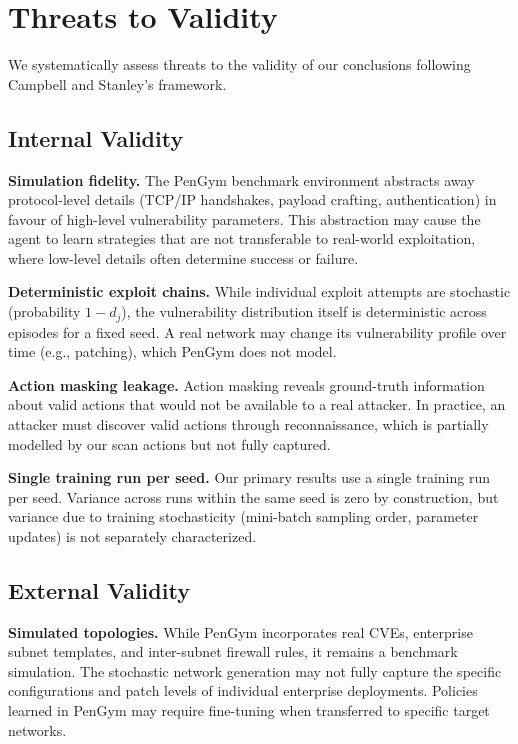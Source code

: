 \documentclass[conference]{IEEEtran}
\begin{document}
\section{Threats to Validity}
\label{sec:threats}

We systematically assess threats to the validity of our conclusions
following Campbell and Stanley's framework.

\subsection{Internal Validity}

\textbf{Simulation fidelity.}  The PenGym benchmark environment abstracts away
protocol-level details (TCP/IP handshakes, payload crafting,
authentication) in favour of high-level vulnerability parameters.
This abstraction may cause the agent to learn strategies that are
not transferable to real-world exploitation, where low-level details
often determine success or failure.

\textbf{Deterministic exploit chains.}  While individual exploit
attempts are stochastic (probability $1 - d_j$), the vulnerability
distribution itself is deterministic across episodes for a fixed seed.
A real network may change its vulnerability profile over time (e.g.,
patching), which PenGym does not model.

\textbf{Action masking leakage.}  Action masking reveals ground-truth
information about valid actions that would not be available to a real
attacker.  In practice, an attacker must discover valid actions through
reconnaissance, which is partially modelled by our scan actions but not
fully captured.

\textbf{Single training run per seed.}  Our primary results use a
single training run per seed.  Variance across runs within the same
seed is zero by construction, but variance due to training stochasticity
(mini-batch sampling order, parameter updates) is not separately
characterized.

\subsection{External Validity}

\textbf{Simulated topologies.}  While PenGym incorporates
real CVEs, enterprise subnet templates, and inter-subnet firewall
rules, it remains a benchmark simulation.  The stochastic network generation
may not fully capture the specific configurations and patch levels
of individual enterprise deployments.  Policies learned in PenGym
may require fine-tuning when transferred to specific target networks.
\end{document}
